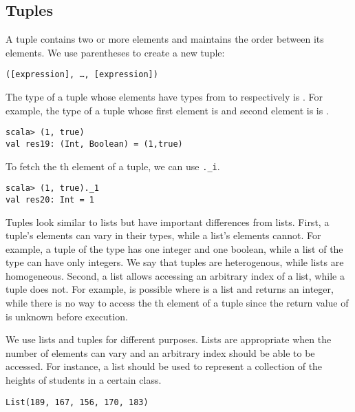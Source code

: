 \subsection{Tuples}

A tuple contains two or more elements and maintains the order between its
elements. We use parentheses to create a new tuple:

\begin{verbatim}
([expression], …, [expression])
\end{verbatim}

The type of a tuple whose elements have types from  to 
respectively is . For example, the type of a tuple
whose first element is  and second element is  is
.

\begin{verbatim}
scala> (1, true)
val res19: (Int, Boolean) = (1,true)
\end{verbatim}

To fetch the th element of a tuple, we can use \verb+._i+.

\begin{verbatim}
scala> (1, true)._1
val res20: Int = 1
\end{verbatim}

Tuples look similar to lists but have important differences from
lists. First, a tuple's elements can vary in their types, while a list's
elements cannot. For example, a tuple of the type  has
one integer and one boolean, while a list of the type  can have
only integers. We say that tuples are heterogenous, while lists are homogeneous.
Second, a list allows accessing an arbitrary index of a list,
while a tuple does not. For example,  is possible where  is
a list and  returns an integer, while there is no way to access the
th element of a tuple since the return value of  is unknown
before execution.

We use lists and tuples for different purposes. Lists are appropriate when the
number of elements can vary and an arbitrary index should be able to be accessed.
For instance, a list should be used to represent a collection of the heights of
students in a certain class.

\begin{verbatim}
List(189, 167, 156, 170, 183)
\end{verbatim}

